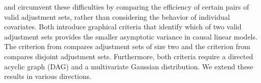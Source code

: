 \documentclass[11pt,a4paper]{article}
\theoremstyle{definition}
\theoremstyle{remark}
\begin{document}




\citet{kuroki2003covariate} and \citet{kuroki2004selection} circumvent these difficulties by comparing the efficiency of certain pairs of valid adjustment sets, rather than considering the behavior of individual covariates. 
Both introduce graphical criteria that identify which of two valid adjustment sets provides the smaller asymptotic variance in causal linear models. The criterion from \citet{kuroki2003covariate} compares adjustment sets of size two and the criterion from \citet{kuroki2004selection} compares disjoint adjustment sets. Furthermore, both criteria require a directed acyclic graph (DAG) and a multivariate Gaussian distribution. We extend these results in various directions. 





%
%
\end{document}
